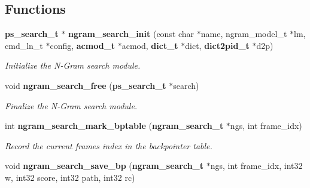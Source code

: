 \subsection*{Functions}
\begin{DoxyCompactItemize}
\item 
{\bf ps\+\_\+search\+\_\+t} $\ast$ {\bf ngram\+\_\+search\+\_\+init} (const char $\ast$name, ngram\+\_\+model\+\_\+t $\ast$lm, cmd\+\_\+ln\+\_\+t $\ast$config, {\bf acmod\+\_\+t} $\ast$acmod, {\bf dict\+\_\+t} $\ast$dict, {\bf dict2pid\+\_\+t} $\ast$d2p)\label{ngram__search_8c_a04f80b377c847026254fb85596e2f43c}

\begin{DoxyCompactList}\small\item\em Initialize the N-\/\+Gram search module. \end{DoxyCompactList}\item 
void {\bf ngram\+\_\+search\+\_\+free} ({\bf ps\+\_\+search\+\_\+t} $\ast$search)\label{ngram__search_8c_aeaf140dc2bbeaa5c274f73480b5328f3}

\begin{DoxyCompactList}\small\item\em Finalize the N-\/\+Gram search module. \end{DoxyCompactList}\item 
int {\bf ngram\+\_\+search\+\_\+mark\+\_\+bptable} ({\bf ngram\+\_\+search\+\_\+t} $\ast$ngs, int frame\+\_\+idx)
\begin{DoxyCompactList}\small\item\em Record the current frame\textquotesingle{}s index in the backpointer table. \end{DoxyCompactList}\item 
void {\bf ngram\+\_\+search\+\_\+save\+\_\+bp} ({\bf ngram\+\_\+search\+\_\+t} $\ast$ngs, int frame\+\_\+idx, int32 w, int32 score, int32 path, int32 rc)\label{ngram__search_8c_ae36649be6f5a2190e759e7ed13bd7b6b}


\end{DoxyCompactItemize}
